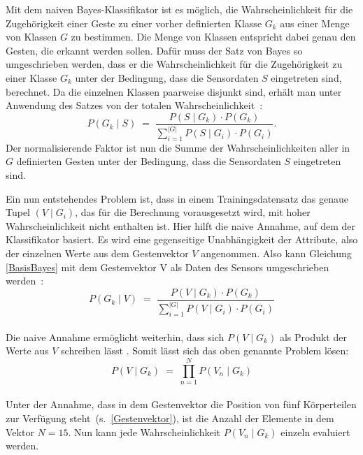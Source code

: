 Mit dem naiven Bayes-Klassifikator ist es möglich, die Wahrscheinlichkeit für die Zugehörigkeit einer Geste zu einer vorher definierten Klasse $G_k$ aus einer Menge von Klassen $G$ zu bestimmen. Die Menge von Klassen entspricht dabei genau den Gesten, die erkannt werden sollen. Dafür muss der Satz von Bayes so umgeschrieben werden, dass er die Wahrscheinlichkeit für die Zugehörigkeit zu einer Klasse $G_k$ unter der Bedingung, dass die Sensordaten $S$ eingetreten sind, berechnet. Da die einzelnen Klassen paarweise disjunkt sind, erhält man unter Anwendung des Satzes von der totalen Wahrscheinlichkeit~\cite{tuckwellWahrscheinlichkeit}:
\begin{equation} \label{BasisBayes}
    P(G_k\mid S) \; = \; \frac{P(S\mid G_k)\cdot P(G_k)}{\sum_{i=1} ^{|G|} P(S\mid G_i) \cdot P(G_i)}.
\end{equation}
Der normalisierende Faktor ist nun die Summe der Wahrscheinlichkeiten aller in $G$ definierten Gesten unter der Bedingung, dass die Sensordaten $S$ eingetreten sind.

Ein nun entstehendes Problem ist, dass in einem Trainingsdatensatz das genaue Tupel $(V\mid G_i)$, das für die Berechnung vorausgesetzt wird, mit hoher Wahrscheinlichkeit nicht enthalten ist. Hier hilft die naive Annahme, auf dem der Klassifikator basiert. Es wird eine gegenseitige Unabhängigkeit der Attribute, also der einzelnen Werte aus dem Gestenvektor $V$ angenommen. Also kann Gleichung \eqref{BasisBayes} mit dem Gestenvektor V als Daten des Sensors umgeschrieben werden~\cite{gillianANBC}:
\begin{equation}
    P(G_k\mid V) \; = \; \frac{P(V\mid G_k)\cdot P(G_k)}{\sum_{i=1} ^{|G|} P(V\mid G_i) \cdot P(G_i)}
\end{equation} \\
Die naive Annahme ermöglicht weiterhin, dass sich $P(V\mid G_k)$ als Produkt der Werte aus $V$ schreiben lässt \cite{BouNaiveBayes, patternClassification2}. Somit lässt sich das oben genannte Problem lösen:
\begin{equation} \label{naiveBayes1}
    P(V\mid G_k) \; = \; \prod_{n=1} ^{N} P(V_n\mid G_k)
\end{equation} \\
Unter der Annahme, dass in dem Gestenvektor die Position von fünf Körperteilen zur Verfügung steht~(s.~\eqref{Gestenvektor}), ist die Anzahl der Elemente in dem Vektor $N=15$. Nun kann jede Wahrscheinlichkeit $P(V_n\mid G_k)$ einzeln evaluiert werden.~\cite{BouNaiveBayes}

